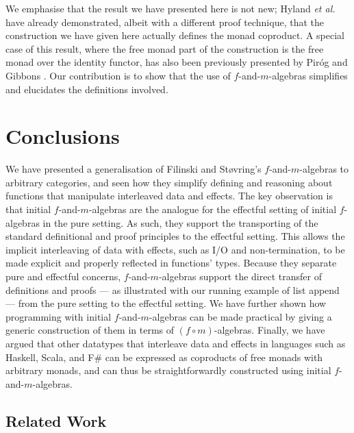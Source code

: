 \documentclass{jfp1}
\begin{document}
We emphasise that the result we have presented here is not new; Hyland
\emph{et al.} have already demonstrated, albeit with a different proof
technique, that the construction we have given here actually defines the monad
coproduct. A special case of this result, where the free monad part of
the construction is the free monad over the identity functor, has also
been previously presented by Pir{\'o}g and Gibbons
\cite{pirog12tracing}. Our contribution is to show that the use of
$f$-and-$m$-algebras simplifies and elucidates the definitions
involved.

\section{Conclusions}
\label{sec:conclusions}

We have presented a generalisation of Filinski and St\o{}vring's
$f$-and-$m$-algebras to arbitrary categories, and seen how they
simplify defining and reasoning about functions that manipulate
interleaved data and effects. The key observation is that initial
$f$-and-$m$-algebras are the analogue for the effectful setting of
initial $f$-algebras in the pure setting. As such, they support the
transporting of the standard definitional and proof principles to the
effectful setting. This allows the implicit interleaving of data with
effects, such as I/O and non-termination, to be made explicit and
properly reflected in functions' types. Because they separate pure and
effectful concerns, $f$-and-$m$-algebras support the direct transfer
of definitions and proofs --- as illustrated with our running example
of list append --- from the pure setting to the effectful setting. We
have further shown how programming with initial $f$-and-$m$-algebras
can be made practical by giving a generic construction of them in
terms of $(f \circ m)$-algebras. Finally, we have argued that other
datatypes that interleave data and effects in languages such as
Haskell, Scala, and F\# can be expressed as coproducts of free monads
with arbitrary monads, and can thus be straightforwardly constructed
using initial $f$-and-$m$-algebras.

\subsection{Related Work}
\end{document}
